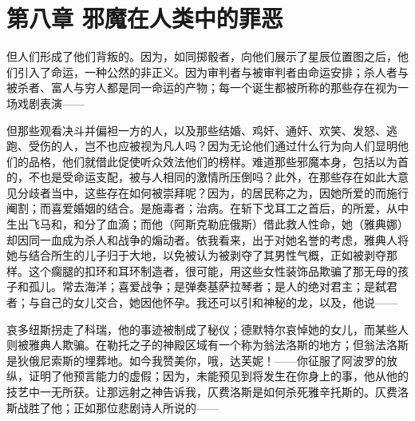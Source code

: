
\section{第八章 邪魔在人类中的罪恶}

但人们形成了他们背叛的。因为，如同掷骰者，向他们展示了星辰位置图之后，他们引入了命运，一种公然的非正义。因为审判者与被审判者由命运安排；杀人者与被杀者、富人与穷人都是同一命运的产物；每一个诞生都被所称的那些存在视为一场戏剧表演——\par

\par

但那些观看决斗并偏袒一方的人，以及那些结婚、鸡奸、通奸、欢笑、发怒、逃跑、受伤的人，岂不也应被视为凡人吗？因为无论他们通过什么行为向人们显明他们的品格，他们就借此促使听众效法他们的榜样。难道那些邪魔本身，包括以为首的，不也是受命运支配，被与人相同的激情所压倒吗？此外，在那些存在如此大意见分歧者当中，这些存在如何被崇拜呢？因为，的居民称之为，因她所爱的而施行阉割；而喜爱婚姻的结合。是施毒者；治病。在斩下戈耳工之首后，的所爱，从中生出飞马和，和分了血滴；而他（阿斯克勒庇俄斯）借此救人性命，她（雅典娜）却因同一血成为杀人和战争的煽动者。依我看来，出于对她名誉的考虑，雅典人将她与结合所生的儿子归于大地，以免被认为被剥夺了其男性气概，正如被剥夺那样。这个瘸腿的扣环和耳环制造者，很可能，用这些女性装饰品欺骗了那无母的孩子和孤儿。常去海洋；喜爱战争；是弹奏基萨拉琴者；是人的绝对君主；是弑君者；与自己的女儿交合，她因他怀孕。我还可以引和神秘的龙，以及，他说——\par

\par

哀多纽斯拐走了科瑞，他的事迹被制成了秘仪；德默特尔哀悼她的女儿，而某些人则被雅典人欺骗。在勒托之子的神殿区域有一个称为翁法洛斯的地方；但翁法洛斯是狄俄尼索斯的埋葬地。如今我赞美你，哦，达芙妮！——你征服了阿波罗的放纵，证明了他预言能力的虚假；因为，未能预见到将发生在你身上的事，他从他的技艺中一无所获。让那远射之神告诉我，仄费洛斯是如何杀死雅辛托斯的。仄费洛斯战胜了他；正如那位悲剧诗人所说的——\par

